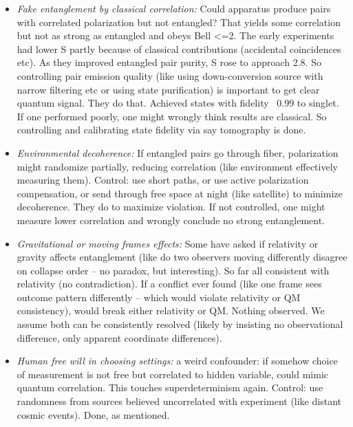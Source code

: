 \documentclass[11pt]{article}
\begin{document}
\begin{itemize}
\item 
\textit{Fake entanglement by classical correlation:} Could apparatus produce pairs with correlated polarization but not entangled? That yields some correlation but not as strong as entangled and obeys Bell <=2. The early experiments had lower S partly because of classical contributions (accidental coincidences etc). As they improved entangled pair purity, S rose to approach 2.8. So controlling pair emission quality (like using down-conversion source with narrow filtering etc or using state purification) is important to get clear quantum signal. They do that. Achieved states with fidelity ~0.99 to singlet. If one performed poorly, one might wrongly think results are classical. So controlling and calibrating state fidelity via say tomography is done.




\item 
\textit{Environmental decoherence:} If entangled pairs go through fiber, polarization might randomize partially, reducing correlation (like environment effectively measuring them). Control: use short paths, or use active polarization compensation, or send through free space at night (like satellite) to minimize decoherence. They do to maximize violation. If not controlled, one might measure lower correlation and wrongly conclude no strong entanglement.




\item 
\textit{Gravitational or moving frames effects:} Some have asked if relativity or gravity affects entanglement (like do two observers moving differently disagree on collapse order – no paradox, but interesting). So far all consistent with relativity (no contradiction). If a conflict ever found (like one frame sees outcome pattern differently – which would violate relativity or QM consistency), would break either relativity or QM. Nothing observed. We assume both can be consistently resolved (likely by insisting no observational difference, only apparent coordinate differences).




\item 
\textit{Human free will in choosing settings:} a weird confounder: if somehow choice of measurement is not free but correlated to hidden variable, could mimic quantum correlation. This touches superdeterminism again. Control: use randomness from sources believed uncorrelated with experiment (like distant cosmic events). Done, as mentioned.





\end{itemize}
\end{document}
